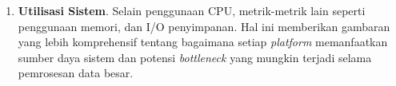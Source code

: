 \begin{enumerate}
\begin{enumerate}
	\item \textbf{Utilisasi Sistem}. Selain penggunaan CPU, metrik-metrik lain seperti penggunaan memori, dan I/O penyimpanan. Hal ini memberikan gambaran yang lebih komprehensif tentang bagaimana setiap \textit{platform} memanfaatkan sumber daya sistem dan potensi \textit{bottleneck} yang mungkin terjadi selama pemrosesan data besar.
	\end{enumerate}
\end{enumerate}











